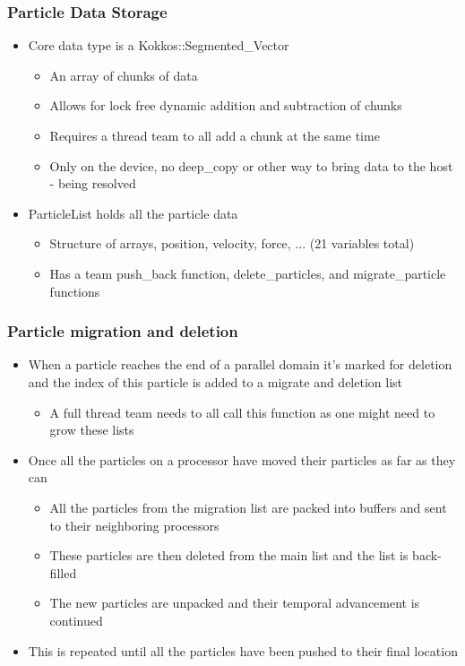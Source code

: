 \documentclass[t]{beamer}
\begin{document}
\begin{frame}
 
 \frametitle{Particle Data Storage}
 \begin{itemize}
 \item Core data type is a Kokkos::Segmented\_Vector
 \begin{itemize}
 \item An array of chunks of data
 \item Allows for lock free dynamic addition and subtraction of chunks
 \item Requires a thread team to all add a chunk at the same time
  \item Only on the device, no deep\_copy or other way to bring data
    to the host - being resolved
 \end{itemize}
 \item ParticleList holds all the particle data
 \begin{itemize}
 \item Structure of arrays, position, velocity, force, ... (21 variables total)
 \item Has a team push\_back function, delete\_particles, and migrate\_particle functions
 \end{itemize}
 \end{itemize}
\end{frame}
\begin{frame}
 
 \frametitle{Particle migration and deletion}

 \begin{itemize}
   \item When a particle reaches the end of a parallel domain it's
     marked for deletion and the index of this particle is added to a
     migrate and deletion list
     \begin{itemize}
     \item A full thread team needs to all call this function as one
       might need to grow these lists
     \end{itemize}
   \item Once all the particles on a processor have moved their
     particles as far as they can
     \begin{itemize}
     \item All the particles from the migration list are packed into
       buffers and sent to their neighboring processors
     \item These particles are then deleted from the main list and the
       list is back-filled
     \item The new particles are unpacked and their temporal
       advancement is continued  
     \end{itemize}
     \item This is repeated until all the particles have been pushed
       to their final location
 \end{itemize}


\end{frame}
\end{document}
